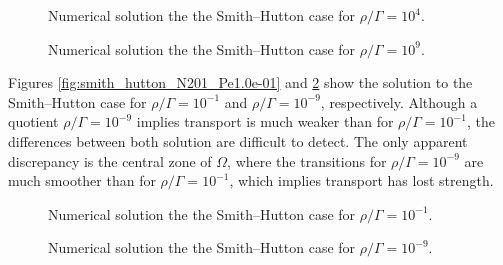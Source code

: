 \begin{figure}[ht]
	\centering
	
	\caption{Numerical solution the the Smith--Hutton case for $\rho / \Gamma = 10^4$.}
	\label{fig:smith_hutton_N201_Pe1.0e+04}
	\vspace{1cm}
	
	\caption{Numerical solution the the Smith--Hutton case for $\rho / \Gamma = 10^9$.}
	\label{fig:smith_hutton_N201_Pe1.0e+09}
\end{figure}


% 	

% 	


\clearpage

Figures \ref{fig:smith_hutton_N201_Pe1.0e-01} and
\ref{fig:smith_hutton_N201_Pe1.0e-09} show the solution to the Smith--Hutton
case for $\rho / \Gamma = 10^{-1}$ and $\rho / \Gamma = 10^{-9}$, respectively.
Although a quotient $\rho / \Gamma = 10^{-9}$ implies transport is much weaker
than for $\rho / \Gamma = 10^{-1}$, the differences between both solution are
difficult to detect. The only apparent discrepancy is the central zone of
$\Omega$, where the transitions for $\rho / \Gamma = 10^{-9}$ are much smoother
than for $\rho / \Gamma = 10^{-1}$, which implies transport has lost strength.

\begin{figure}[ht]
	\centering
	
	\caption{Numerical solution the the Smith--Hutton case for $\rho / \Gamma = 10^{-1}$.}
	\label{fig:smith_hutton_N201_Pe1.0e-01}
	\vspace{1cm}
	
	\caption{Numerical solution the the Smith--Hutton case for $\rho / \Gamma = 10^{-9}$.}
	\label{fig:smith_hutton_N201_Pe1.0e-09}
\end{figure}




